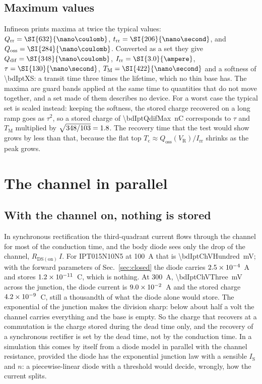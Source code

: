 \documentclass[10pt,a4paper]{scrartcl}
\newcommand{\VR}{V_\mathrm{R}}
\newcommand{\Irr}{I_\mathrm{rr}}
\newcommand{\Qrr}{Q_\mathrm{rr}}
\newcommand{\Qdif}{Q_\mathrm{dif}}
\newcommand{\Qoss}{Q_\mathrm{oss}}
\newcommand{\trr}{t_\mathrm{rr}}
\newcommand{\Tc}{T_\mathrm{c}}
\newcommand{\TM}{T_\mathrm{M}}
\newcommand{\IS}{I_\mathrm{S}}
\newcommand{\Rds}{R_\mathrm{DS(on)}}
\newcommand{\IPT}{IPT015N10N5}
\begin{document}
\subsection{Maximum values}
\label{sec:maxima}
Infineon prints maxima at twice the typical values: $\Qrr = \SI{\bdIptQrrMax}{\nano\coulomb}$, $\trr = \SI{\bdIptTrrMax}{\nano\second}$, and $\Qoss = \SI{\bdIptQossMax}{\nano\coulomb}$. Converted as a set they give $\Qdif = \SI{\bdIptQdifMax}{\nano\coulomb}$, $\Irr = \SI{\bdIptXIrr}{\ampere}$, $\tau = \SI{\bdIptXTau}{\nano\second}$, $\TM = \SI{\bdIptXTm}{\nano\second}$ and a softness of \num{\bdIptXS}: a transit time three times the lifetime, which no thin base has. The maxima are guard bands applied at the same time to quantities that do not move together, and a set made of them describes no device. For a worst case the typical set is scaled instead: keeping the softness, the stored charge recovered on a long ramp goes as $\tau^2$, so a stored charge of \SI{\bdIptQdifMax}{\nano\coulomb} corresponds to $\tau$ and $\TM$ multiplied by $\sqrt{348/103} = 1.8$. The recovery time that the test would show grows by less than that, because the flat top $\Tc \approx \Qoss(\VR)/\Irr$ shrinks as the peak grows.

\section{The channel in parallel}
\label{sec:channel}
\subsection{With the channel on, nothing is stored}
\label{sec:channelon}
In synchronous rectification the third-quadrant current flows through the channel for most of the conduction time, and the body diode sees only the drop of the channel, $\Rds\,I$. For \IPT{} at \SI{100}{\ampere} that is \SI{\bdIptChVHundred}{\milli\volt}; with the forward parameters of Sec.~\ref{sec:closed} the diode carries $2.5\times10^{-4}$~A and stores $1.2\times10^{-11}$~C, which is nothing. At \SI{300}{\ampere}, \SI{\bdIptChVThree}{\milli\volt} across the junction, the diode current is $9.0\times10^{-2}$~A and the stored charge $4.2\times10^{-9}$~C, still a thousandth of what the diode alone would store. The exponential of the junction makes the division sharp: below about half a volt the channel carries everything and the base is empty. So the charge that recovers at a commutation is the charge stored during the dead time only, and the recovery of a synchronous rectifier is set by the dead time, not by the conduction time. In a simulation this comes by itself from a diode model in parallel with the channel resistance, provided the diode has the exponential junction law with a sensible $\IS$ and $n$: a piecewise-linear diode with a threshold would decide, wrongly, how the current splits.
\end{document}
